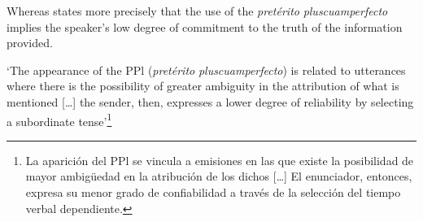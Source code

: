 \documentclass[output=paper]{langsci/langscibook}
\begin{document}
Whereas \citet[111]{Speranza2014} states more precisely that the use of the \textit{pretérito} \textit{pluscuamperfecto} implies the speaker’s low degree of commitment to the truth of the information provided. 

\begin{displayquote}
‘The appearance of the PPl (\textit{pretérito} \textit{pluscuamperfecto}) is related to utterances where there is the possibility of greater ambiguity in the attribution of what is mentioned […] the sender, then, expresses a lower degree of reliability by selecting a subordinate tense’\footnote{La aparición del PPl se vincula a emisiones en las que existe la posibilidad de mayor ambigüedad en la atribución de los dichos […] El enunciador, entonces, expresa su menor grado de confiabilidad a través de la selección del tiempo verbal dependiente.}	
\end{displayquote}
\end{document}
